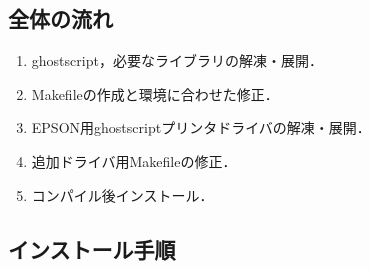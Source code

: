 \documentclass[a4j]{jarticle}
\begin{document}
\subsection*{全体の流れ}
\begin{enumerate}
\item ghostscript，必要なライブラリの解凍・展開．
\item Makefileの作成と環境に合わせた修正．
\item EPSON用ghostscriptプリンタドライバの解凍・展開．
\item 追加ドライバ用Makefileの修正．
\item コンパイル後インストール．
\end{enumerate}

\subsection*{インストール手順}
\end{document}

